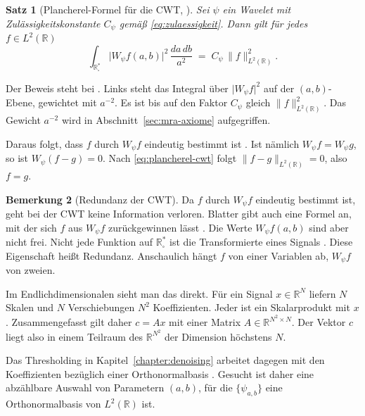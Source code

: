 \documentclass[a4paper,11pt,bibliography=totoc,listof=totoc,headinclude=true,cleardoublepage=empty,oneside]{scrbook}
\theoremstyle{plain}
\newtheorem{Satz}{Satz}[chapter]
\theoremstyle{definition}
\newtheorem{Bemerkung}[Satz]{Bemerkung}
\newcommand{\R}{\mathbb{R}}
\newcommand{\LZwei}{L^2(\R)}
\newcommand{\norm}[1]{\lVert #1 \rVert}
\begin{document}
\begin{Satz}[Plancherel-Formel für die CWT, {\cite[Satz~(3.3)]{blatter}}] %
\label{satz:plancherel-cwt}
Sei $\psi$ ein Wavelet mit Zulässigkeitskonstante $C_\psi$ gemä\ss{}
\eqref{eq:zulaessigkeit}. Dann gilt für jedes $f \in \LZwei$
\begin{equation}
\label{eq:plancherel-cwt}
  \int_{\R^*_\square} \lvert W_\psi f(a,b)\rvert^2\,\frac{da\,db}{a^2}
  \;=\; C_\psi\,\norm{f}_{\LZwei}^2 .
\end{equation}
\end{Satz}
Der Beweis steht bei \cite[Satz~(3.3)]{blatter}. %
Links steht das Integral über $\lvert W_\psi f\rvert^2$ auf der
$(a,b)$-Ebene, gewichtet mit $a^{-2}$. Es ist bis auf den Faktor $C_\psi$
gleich $\norm{f}_{\LZwei}^2$. Das Gewicht $a^{-2}$ wird in
Abschnitt~\ref{sec:mra-axiome} aufgegriffen.

Daraus folgt, dass $f$ durch $W_\psi f$ eindeutig bestimmt ist
\cite[Satz~(3.3)]{blatter}. %
Ist nämlich $W_\psi f = W_\psi g$, so ist $W_\psi(f-g) = 0$. Nach
\eqref{eq:plancherel-cwt} folgt $\norm{f-g}_{\LZwei} = 0$, also $f = g$.

\begin{Bemerkung}[Redundanz der CWT]
\label{bem:redundanz}
Da $f$ durch $W_\psi f$ eindeutig bestimmt ist, geht bei der CWT keine
Information verloren. Blatter gibt auch eine Formel an, mit der sich $f$ aus
$W_\psi f$ zurückgewinnen lässt \cite[Kap.~3.3]{blatter}. %
Die Werte $W_\psi f(a,b)$ sind aber nicht frei. Nicht jede Funktion auf
$\R^*_\square$ ist die Transformierte eines Signals
\cite[Kap.~3.4]{blatter}. %
Diese Eigenschaft hei\ss{}t Redundanz. Anschaulich hängt $f$ von einer
Variablen ab, $W_\psi f$ von zweien.

Im Endlichdimensionalen sieht man das direkt. Für ein Signal $x \in \R^N$
liefern $N$ Skalen und $N$ Verschiebungen $N^2$ Koeffizienten. Jeder ist ein
Skalarprodukt mit $x$. Zusammengefasst gilt daher $c = Ax$ mit einer Matrix
$A \in \R^{N^2 \times N}$. Der Vektor $c$ liegt also in einem Teilraum des
$\R^{N^2}$ der Dimension höchstens $N$.

Das Thresholding in Kapitel~\ref{chapter:denoising} arbeitet dagegen mit den
Koeffizienten bezüglich einer Orthonormalbasis \cite[Kap.~11.2]{mallat}. %
Gesucht ist daher eine abzählbare Auswahl von Parametern $(a,b)$, für die
$\{\psi_{a,b}\}$ eine Orthonormalbasis von $\LZwei$ ist.
\end{Bemerkung}
\end{document}
